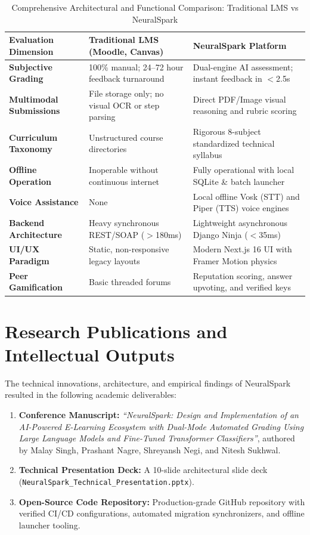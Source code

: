 \begin{table}[H]
\centering
\caption{Comprehensive Architectural and Functional Comparison: Traditional LMS vs NeuralSpark}
\label{tab:lms_comprehensive_comparison}
\small
\begin{tabularx}{\textwidth}{p{3.5cm} p{4.5cm} X}
\toprule
\textbf{Evaluation Dimension} & \textbf{Traditional LMS (Moodle, Canvas)} & \textbf{NeuralSpark Platform} \\
\midrule
\textbf{Subjective Grading} & 100\% manual; 24--72 hour feedback turnaround & Dual-engine AI assessment; instant feedback in $<$2.5s \\
\textbf{Multimodal Submissions} & File storage only; no visual OCR or step parsing & Direct PDF/Image visual reasoning and rubric scoring \\
\textbf{Curriculum Taxonomy} & Unstructured course directories & Rigorous 8-subject standardized technical syllabus \\
\textbf{Offline Operation} & Inoperable without continuous internet & Fully operational with local SQLite \& batch launcher \\
\textbf{Voice Assistance} & None & Local offline Vosk (STT) and Piper (TTS) voice engines \\
\textbf{Backend Architecture} & Heavy synchronous REST/SOAP ($>$180ms) & Lightweight asynchronous Django Ninja ($<$35ms) \\
\textbf{UI/UX Paradigm} & Static, non-responsive legacy layouts & Modern Next.js 16 UI with Framer Motion physics \\
\textbf{Peer Gamification} & Basic threaded forums & Reputation scoring, answer upvoting, and verified keys \\
\bottomrule
\end{tabularx}
\end{table}

\section{Research Publications and Intellectual Outputs}
The technical innovations, architecture, and empirical findings of NeuralSpark resulted in the following academic deliverables:
\begin{enumerate}[leftmargin=*]
    \item \textbf{Conference Manuscript:} \textit{``NeuralSpark: Design and Implementation of an AI-Powered E-Learning Ecosystem with Dual-Mode Automated Grading Using Large Language Models and Fine-Tuned Transformer Classifiers''}, authored by Malay Singh, Prashant Nagre, Shreyansh Negi, and Nitesh Sukhwal.
    \item \textbf{Technical Presentation Deck:} A 10-slide architectural slide deck (\texttt{NeuralSpark\_Technical\_Presentation.pptx}).
    \item \textbf{Open-Source Code Repository:} Production-grade GitHub repository with verified CI/CD configurations, automated migration synchronizers, and offline launcher tooling.
\end{enumerate}
